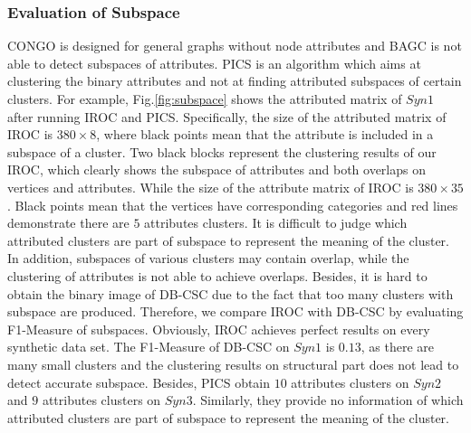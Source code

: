 \subsubsection{Evaluation of Subspace}
CONGO is designed for general graphs without node attributes and BAGC is not able to detect subspaces of attributes. PICS is an algorithm which aims at clustering the binary attributes and not at finding attributed subspaces of certain clusters. For example, Fig.\ref{fig:subspace} shows the attributed matrix of $Syn1$ after running IROC and PICS. Specifically, the size of the attributed matrix of IROC is $380 \times 8 $, where black points mean that the attribute is included in a subspace of a cluster. Two black blocks represent the clustering results of our IROC, which clearly shows the subspace of attributes and both overlaps on vertices and attributes. While the size of the attribute matrix of IROC is $380 \times 35 $. Black points mean that the vertices have corresponding categories and red lines demonstrate there are $5$ attributes clusters. It is difficult to judge which attributed clusters are part of subspace to represent the meaning of the cluster. In addition, subspaces of various clusters may contain overlap, while the clustering of attributes is not able to achieve overlaps. Besides, it is hard to obtain the binary image of DB-CSC due to the fact that too many clusters with subspace are produced. Therefore, we compare IROC with DB-CSC by evaluating F1-Measure of subspaces. Obviously, IROC achieves perfect results on every synthetic data set. The F1-Measure of DB-CSC on $Syn1$ is $0.13$, as there are many small clusters and the clustering results on structural part does not lead to detect accurate subspace. Besides, PICS obtain $10$ attributes clusters on $Syn2$ and $9$ attributes clusters on $Syn3$. Similarly, they provide no information of which attributed clusters are part of subspace to represent the meaning of the cluster.

